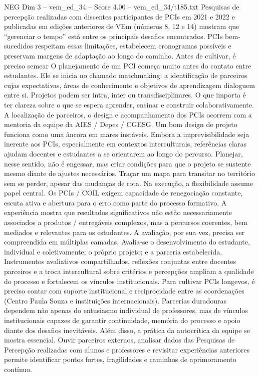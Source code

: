 \begin{textsample}{NEG Dim 3 – vem\_ed\_34 – Score 4.00 – vem\_ed\_34/t185.txt}
Pesquisas de percepção realizadas com discentes participantes de PCIs em 2021 e 2022 e publicadas em edições anteriores de VEm (números 8, 12 e 14) mostram que “gerenciar o tempo” está entre os principais desafios encontrados.
PCIs bem-sucedidos respeitam essas limitações, estabelecem cronogramas possíveis e preservam margens de adaptação ao longo do caminho.
Antes de cultivar, é preciso semear O planejamento de um PCI começa muito antes do contato entre estudantes.
Ele se inicia no chamado matchmaking: a identificação de parceiros cujas expectativas, áreas de conhecimento e objetivos de aprendizagem dialoguem entre si.
Projetos podem ser intra, inter ou transdisciplinares.
O que importa é ter clareza sobre o que se espera aprender, ensinar e construir colaborativamente.
A localização de parceiros, o design e acompanhamento dos PCIs ocorrem com a mentoria da equipe da AIES / Depes / CGESG.
Um bom design de projeto funciona como uma âncora em mares instáveis.
Embora a imprevisibilidade seja inerente aos PCIs, especialmente em contextos interculturais, referências claras ajudam docentes e estudantes a se orientarem ao longo do percurso.
Planejar, nesse sentido, não é engessar, mas criar condições para que o projeto se sustente mesmo diante de ajustes necessários.
Traçar um mapa para transitar no território sem se perder, apesar das mudanças de rota.
Na execução, a flexibilidade assume papel central.
Os PCIs / COIL exigem capacidade de renegociação constante, escuta ativa e abertura para o erro como parte do processo formativo.
A experiência mostra que resultados significativos não estão necessariamente associados a produtos / entregáveis complexos, mas a percursos coerentes, bem mediados e relevantes para os estudantes.
A avaliação, por sua vez, precisa ser compreendida em múltiplas camadas.
Avalia-se o desenvolvimento do estudante, individual e coletivamente; o próprio projeto; e a parceria estabelecida.
Instrumentos avaliativos compartilhados, reflexões conjuntas entre docentes parceiros e a troca intercultural sobre critérios e percepções ampliam a qualidade do processo e fortalecem os vínculos institucionais.
Para cultivar PCIs longevos, é preciso contar com suporte institucional e reciprocidade entre as coordenações (Centro Paula Souza e instituições internacionais).
Parcerias duradouras dependem não apenas do entusiasmo individual de professores, mas de vínculos institucionais capazes de garantir continuidade, memória do processo e apoio diante dos desafios inevitáveis.
Além disso, a prática da autocrítica da equipe se mostra essencial.
Ouvir parceiros externos, analisar dados das Pesquisas de Percepção realizadas com alunos e professores e revisitar experiências anteriores permite identificar pontos fortes, fragilidades e caminhos de aprimoramento contínuo.

\end{textsample}
